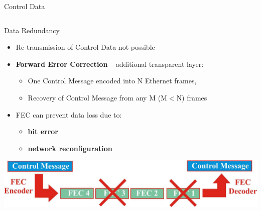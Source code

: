 \documentclass[compress,red]{beamer}
\begin{document}
\begin{frame}{Control Data}
\begin{columns}[c]
\begin{center}
    \end{center}

\end{columns}

\end{frame}
\begin{frame}{Data Redundancy}

  \begin{itemize}
    \item Re-transmission of Control Data not possible
	\item {\bf Forward Error Correction}  -- additional transparent layer:
	\begin{itemize}
		\item One Control Message encoded into N Ethernet frames,
		\item Recovery of Control Message from any M (M$<$N) frames
	\end{itemize}
	\item FEC can prevent data loss due to:
	\begin{itemize}	
		\item {\bf bit error} 
		\item {\bf network reconfiguration}
	\end{itemize}	
  \end{itemize}
  
  	\begin{center}
      \includegraphics[width=.7\textwidth]{robustness/FEC.pdf}
    \end{center}
  
\end{frame}
\end{document}
